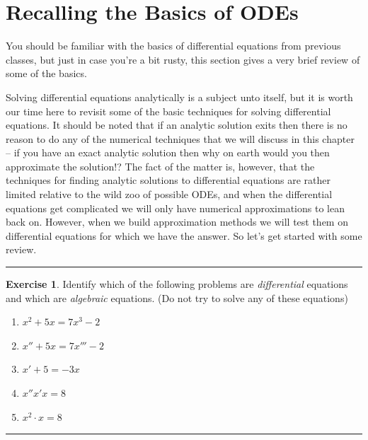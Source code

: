 \documentclass[
]{book}
\providecommand{\tightlist}{%
  \setlength{\itemsep}{0pt}\setlength{\parskip}{0pt}}
\theoremstyle{definition}
\theoremstyle{definition}
\theoremstyle{definition}
\newtheorem{exercise}{Exercise}[chapter]
\theoremstyle{remark}
\begin{document}
\hypertarget{recalling-the-basics-of-odes}{%
\section{Recalling the Basics of ODEs}\label{recalling-the-basics-of-odes}}

You should be familiar with the basics of differential equations from previous classes, but just in case you're a bit rusty, this section gives a very brief review of some of the basics.

Solving differential equations analytically is a subject unto itself, but it is worth our time here to revisit some of the basic techniques for solving differential equations. It should be noted that if an analytic solution exits then there is no reason to do any of the numerical techniques that we will discuss in this chapter -- if you have an exact analytic solution then why on earth would you then approximate the solution!? The fact of the matter is, however, that the techniques for finding analytic solutions to differential equations are rather limited relative to the wild zoo of possible ODEs, and when the differential equations get complicated we will only have numerical approximations to lean back on. However, when we build approximation methods we will test them on differential equations for which we have the answer. So let's get started with some review.

\begin{center}\rule{0.5\linewidth}{0.5pt}\end{center}

\begin{exercise}
\protect\hypertarget{exr:unnamed-chunk-414}{}{\label{exr:unnamed-chunk-414} }Identify which of the following problems are \emph{differential} equations
and which are \emph{algebraic} equations. (Do not try to solve any of these equations)

\begin{enumerate}
\def\labelenumi{\alph{enumi}.}
\tightlist
\item
  \(x^2 + 5x = 7x^3 - 2\)
\item
  \(x'' + 5x = 7x''' - 2\)
\item
  \(x' + 5 = -3x\)
\item
  \(x''x'x = 8\)
\item
  \(x^2 \cdot x = 8\)
\end{enumerate}
\end{exercise}

\begin{center}\rule{0.5\linewidth}{0.5pt}\end{center}
\end{document}
